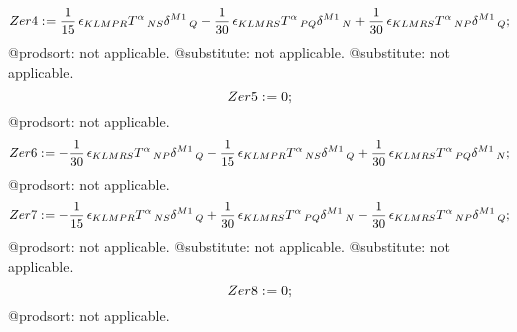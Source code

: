 \documentclass[11pt]{article}
\def\specialcolon{\mathrel{\mathop{:}}\hspace{-.5em}}
\begin{document}
\begin{dmath*}[compact, spread=2pt]
Zer4\specialcolon{}= \frac{1}{15}\, {\epsilon}_{K L M P R} {T}^{\alpha}\,_{N S} {\delta}^{M1}\,_{Q} - \frac{1}{30}\, {\epsilon}_{K L M R S} {T}^{\alpha}\,_{P Q} {\delta}^{M1}\,_{N} + \frac{1}{30}\, {\epsilon}_{K L M R S} {T}^{\alpha}\,_{N P} {\delta}^{M1}\,_{Q};
\end{dmath*}
@prodsort: not applicable.
@substitute: not applicable.
@substitute: not applicable.
\begin{dmath*}[compact, spread=2pt]
Zer5\specialcolon{}= 0;
\end{dmath*}
@prodsort: not applicable.
\begin{dmath*}[compact, spread=2pt]
Zer6\specialcolon{}=  - \frac{1}{30}\, {\epsilon}_{K L M R S} {T}^{\alpha}\,_{N P} {\delta}^{M1}\,_{Q} - \frac{1}{15}\, {\epsilon}_{K L M P R} {T}^{\alpha}\,_{N S} {\delta}^{M1}\,_{Q} + \frac{1}{30}\, {\epsilon}_{K L M R S} {T}^{\alpha}\,_{P Q} {\delta}^{M1}\,_{N};
\end{dmath*}
@prodsort: not applicable.
\begin{dmath*}[compact, spread=2pt]
Zer7\specialcolon{}=  - \frac{1}{15}\, {\epsilon}_{K L M P R} {T}^{\alpha}\,_{N S} {\delta}^{M1}\,_{Q} + \frac{1}{30}\, {\epsilon}_{K L M R S} {T}^{\alpha}\,_{P Q} {\delta}^{M1}\,_{N} - \frac{1}{30}\, {\epsilon}_{K L M R S} {T}^{\alpha}\,_{N P} {\delta}^{M1}\,_{Q};
\end{dmath*}
@prodsort: not applicable.
@substitute: not applicable.
@substitute: not applicable.
\begin{dmath*}[compact, spread=2pt]
Zer8\specialcolon{}= 0;
\end{dmath*}
@prodsort: not applicable.
\end{document}
